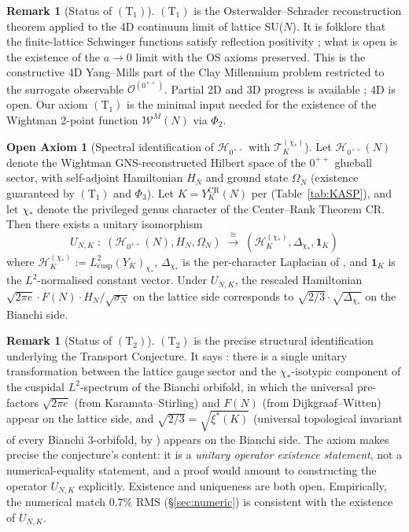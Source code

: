 \documentclass[11pt,a4paper,reqno]{amsart}
\theoremstyle{definition}
\newtheorem{remark}[theorem]{Remark}
\newtheorem{axiom}{Open Axiom}
\newcommand{\YK}{Y_K}
\newcommand{\YKCR}{Y_K^{\mathrm{CR}}}
\newcommand{\Phii}[1]{\Phi_{#1}}
\newcommand{\xis}{\xi^{*}}
\newcommand{\Lcusp}{L^2_{\mathrm{cusp}}}
\newcommand{\Cone}{(\mathrm{T}_{1})}
\newcommand{\Ctwo}{(\mathrm{T}_{2})}
\begin{document}
\begin{remark}[Status of $\Cone$]
$\Cone$ is the Osterwalder--Schrader reconstruction theorem applied
to the 4D continuum limit of lattice SU($N$). It is folklore that the
finite-lattice Schwinger functions satisfy reflection positivity
\cite[\S 6.2]{GlimmJaffe1981}; what is open is the existence of the
$a\to 0$ limit with the OS axioms preserved. This is the constructive
4D Yang--Mills part of the Clay Millennium problem
\cite{JaffeWitten2000} restricted to the surrogate observable
$\mathcal{O}^{(0^{++})}$. Partial 2D and 3D progress is available
\cite{CCHS2D2020,CCHS2022,CaoSheffield2025,Chatterjee2020}; 4D
is open. Our axiom $\Cone$ is the minimal input needed for the
existence of the Wightman 2-point function $\mathcal{W}^M(N)$ via
$\Phii{2}$.
\end{remark}

\begin{axiom}[Spectral identification of $\mathcal{H}_{0^{++}}$ with
  $\mathcal{T}^{(\chi_*)}_K$]\label{ax:T2}
  Let $\mathcal{H}_{0^{++}}(N)$ denote the Wightman GNS-reconstructed
  Hilbert space of the $0^{++}$ glueball sector, with self-adjoint
  Hamiltonian $H_N$ and ground state $\Omega_N$ (existence guaranteed
  by $\Cone$ and $\Phii{3}$). Let $K = \YKCR(N)$ per
  \cite{Remondiere2026CenterRank} (Table~\ref{tab:KASP}), and let
  $\chi_*$ denote the privileged genus character of the Center--Rank
  Theorem CR. Then there exists a unitary isomorphism
  \[
     U_{N,K} \;:\; (\mathcal{H}_{0^{++}}(N), H_N, \Omega_N)
     \;\xrightarrow{\ \cong\ }\;
     (\mathcal{H}^{(\chi_*)}_K, \Delta_{\chi_*}, \mathbf{1}_K)
  \]
  where $\mathcal{H}^{(\chi_*)}_K := \Lcusp(\YK)_{\chi_*}$,
  $\Delta_{\chi_*}$ is the per-character Laplacian of
  \cite{Remondiere2026Selberg}, and $\mathbf{1}_K$ is the
  $L^2$-normalised constant vector. Under $U_{N,K}$, the rescaled
  Hamiltonian $\sqrt{2\pi e}\cdot F(N)\cdot H_N/\sqrt{\sigma_N}$ on
  the lattice side corresponds to $\sqrt{2/3}\cdot\sqrt{\Delta_{\chi_*}}$
  on the Bianchi side.
\end{axiom}

\begin{remark}[Status of $\Ctwo$]
$\Ctwo$ is the precise structural identification underlying the
Transport Conjecture. It says : there is a single unitary
transformation between the lattice gauge sector and the
$\chi_*$-isotypic component of the cuspidal $L^2$-spectrum of the
Bianchi orbifold, in which the universal pre-factors $\sqrt{2\pi e}$
(from Karamata--Stirling) and $F(N)$ (from Dijkgraaf--Witten) appear
on the lattice side, and $\sqrt{2/3} = \sqrt{\xis(K)}$ (universal
topological invariant of every Bianchi 3-orbifold, by
\cite{Remondiere2026CR}) appears on the Bianchi side. The axiom
makes precise the conjecture's content: it is a \emph{unitary
operator existence statement}, not a numerical-equality statement,
and a proof would amount to constructing the operator $U_{N,K}$
explicitly. Existence and uniqueness are both open. Empirically,
the numerical match $0.7\%$ RMS (\S\ref{sec:numeric}) is consistent
with the existence of $U_{N,K}$.
\end{remark}
\end{document}
